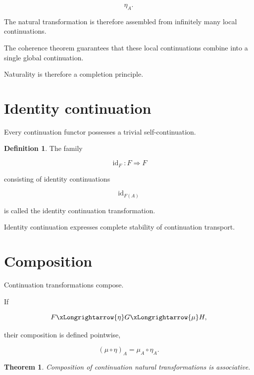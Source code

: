 \documentclass[13pt,openany]{book}
\theoremstyle{plain}
\newtheorem{theorem}{Theorem}[chapter]
\theoremstyle{definition}
\newtheorem{definition}{Definition}[chapter]
\begin{document}
\[
\eta_A.
\]

The natural transformation is therefore assembled from infinitely many local
continuations.

The coherence theorem guarantees that these local continuations combine into a
single global continuation.

Naturality is therefore a completion principle.

\section{Identity continuation}

Every continuation functor possesses a trivial self-continuation.

\begin{definition}

The family

\[
\operatorname{id}_F:
F
\Longrightarrow
F
\]

consisting of identity continuations

\[
\operatorname{id}_{F(A)}
\]

is called the identity continuation transformation.

\end{definition}

Identity continuation expresses complete stability of continuation transport.

\section{Composition}

Continuation transformations compose.

If

\[
F
\xLongrightarrow{\eta}
G
\xLongrightarrow{\mu}
H,
\]

their composition is defined pointwise,

\[
(\mu\circ\eta)_A
=
\mu_A\circ\eta_A.
\]

\begin{theorem}

Composition of continuation natural transformations is associative.

\end{theorem}
\end{document}
